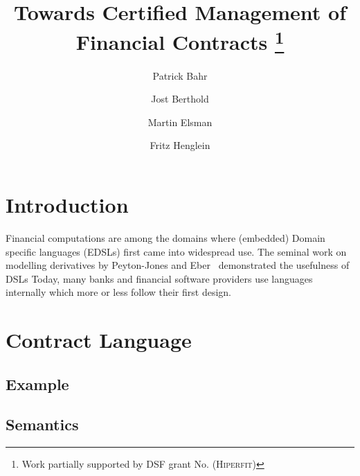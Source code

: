 \documentclass[a4paper,debug,twocolumn]{easychair}
\newcommand{\comm}[3][red]{{\small \color{#1}{$\spadesuit$#2: #3}}}
\newcommand{\jbcomment}[1]{\comm[orange]{jb}{#1}}
\begin{document}
\title{Towards Certified Management of Financial Contracts
\thanks{Work partially supported by DSF grant No.\jbcomment{yaddayadda} (\textsc{Hiperfit})}}


\author{Patrick Bahr
    \and
        Jost Berthold 
    \and 
        Martin Elsman 
    \and 
        Fritz Henglein\\
}



\clearpage
\maketitle

\section{Introduction}

\comm{--}{just writing up some ideas...}

Financial computations are among the domains where (embedded) Domain specific
languages (EDSLs) first came into widespread use.
The seminal work on modelling derivatives by Peyton-Jones and Eber~\cite{ICFP00SPJEber}
demonstrated the usefulness of DSLs \jbcomment{...}
Today, many banks and financial software providers use languages internally which
more or less follow their first design.

\section{Contract Language}
\label{sec:contract-language}

\subsection{Example}
\label{sec:example}

\subsection{Semantics}
\label{sec:semantics}
\end{document}
